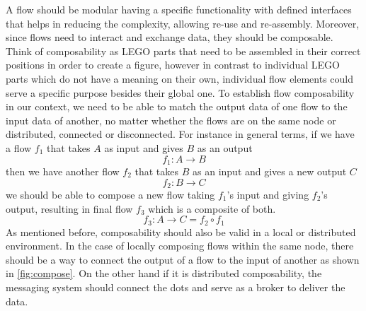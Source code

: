  A flow should be modular having a specific functionality with defined interfaces that helps in reducing the complexity, allowing re-use and re-assembly. Moreover, since flows need to interact and exchange data, they should be composable. Think of composability as LEGO parts that need to be assembled in their correct positions in order to create a figure, however in contrast to individual LEGO parts which do not have a meaning on their own, individual flow elements could serve a specific purpose besides their global one. To establish flow composability in our context, we need to be able to match the output data of one flow to the input data of another, no matter whether the flows are on the same node or distributed, connected or disconnected. For instance in general terms, if we have a flow \(f_1\) that takes \(A\) as input and gives \(B\) as an output
\[ f_1 : A  \to B  \]
then we have another flow \(f_2\) that takes \(B\) as an input and gives a new output \(C\)
\[ f_2 : B  \to C  \]
we should be able to compose a new flow taking \(f_1\)'s input and giving \(f_2\)'s output, resulting in final flow \(f_3\) which is a composite of both.
\[f_3: A \to C = f_2 \circ f_1\]
As mentioned before, composability should also be valid in a local or distributed environment. In the case of locally composing flows within the same node, there should be a way to connect the output of a flow to the input of another as shown in \ref{fig:compose}. On the other hand if it is distributed composability, the messaging system should connect the dots and serve as a broker to deliver the data.

